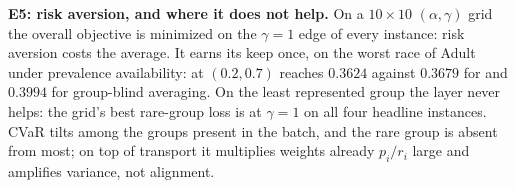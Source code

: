 \noindent\textbf{E5: risk aversion, and where it does not help.}
On a $10\times10$ $(\alpha,\gamma)$ grid the overall objective is minimized
on the $\gamma=1$ edge of every instance: risk aversion costs the average. It earns its keep once, on the worst race of
Adult under prevalence availability: \avotcvar{} at $(0.2,0.7)$ reaches
$0.3624$ against $0.3679$ for \avot{} and $0.3994$ for group-blind averaging. On the least represented group the layer
never helps: the grid's best rare-group loss is at $\gamma{=}1$ on all four
headline instances. CVaR tilts among the groups present in the batch, and the rare
group is absent from most; on top of transport it multiplies weights already
$p_i/r_i$ large and amplifies variance, not alignment.

